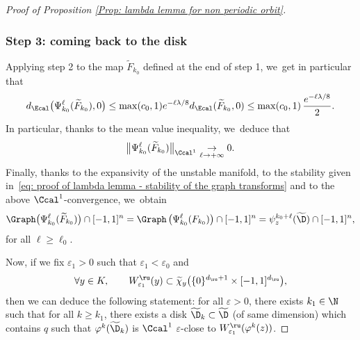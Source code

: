 \begin{appendix}
\begin{proof}[Proof of Proposition \ref{Prop: lambda lemma for non periodic orbit}]
\subsubsection*{Step 3: coming back to the disk}
Applying step 2 to the map $\widetilde{F}_{k_0}$ defined at the end of step 1, we~get in particular that
\[
d_{\Ecal} \bigl(\Psi_{k_0}^{\ell} (\widetilde{F}_{k_0}), 0 \bigr) \leq \max (c_0, 1) e^{- \ell \lambda/8} d_{\Ecal}(\widetilde{F}_{k_0}, 0) \leq \max (c_0, 1)\, \frac{e^{- \ell \lambda/8}}{2}.
\]
In particular, thanks to the mean value inequality, we~deduce that
\[
\bigl\| \Psi_{k_0}^{\ell} (\widetilde{F}_{k_0}) \bigr\|_{\Ccal^1} \underset{\ell \to +\infty}{\to} 0.
\]
Finally, thanks to the expansivity of the unstable manifold, to the stability given in~\eqref{eq: proof of lambda lemma - stability of the graph transforms} and to the above $\Ccal^1$-convergence, we~obtain
\[
\Graph \bigl(\Psi_{k_0}^{\ell} (\widetilde{F}_{k_0}) \bigr) \cap [-1,1]^n = \Graph \left(\Psi_{k_0}^{\ell} (F_{k_0}) \right) \cap [-1,1]^n = \psi_z^{k_0 + \ell}(\widetilde{\D}) \cap [-1,1]^n,
\]
for all $\ell \geq \ell_0$.

Now, if we fix $\varepsilon_1 > 0$ such that $\varepsilon_1 < \varepsilon_0$ and
\[
\forall y \in K, \qquad W_{\varepsilon_1}^\ru (y) \subset \widetilde{\chi}_{y} \bigl(\{0\}^{d_\rs + 1} \times [-1,1]^{d_\ru} \bigr),
\]
then we can deduce the following statement: for all $\varepsilon > 0$, there exists $k_1 \in \N$ such that for all $k \geq k_1$, there exists a disk $\widetilde{\D}_k \subset \widetilde{\D}$ (of same dimension) which contains $q$ such that $\varphi^k(\widetilde{\D}_k)$ is $\Ccal^{1}$ $\varepsilon$-close to $W_{\varepsilon_1}^\ru (\varphi^k (z))$.
\end{proof}

\end{appendix}
